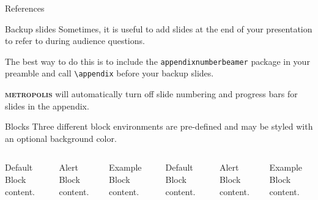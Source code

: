 \documentclass[10pt]{beamer}
\newcommand{\themename}{\textbf{\textsc{metropolis}}\xspace}
\begin{document}
\begin{frame}[allowframebreaks]{References}
  \printbibliography
\end{frame}

\begin{frame}[fragile]{Backup slides}
  Sometimes, it is useful to add slides at the end of your presentation to
  refer to during audience questions.

  The best way to do this is to include the \verb|appendixnumberbeamer|
  package in your preamble and call \verb|\appendix| before your backup slides.

  \themename will automatically turn off slide numbering and progress bars for
  slides in the appendix.
\end{frame}

\begin{frame}{Blocks}
  Three different block environments are pre-defined and may be styled with an
  optional background color.

  \begin{columns}[T,onlytextwidth]
      \begin{block}{Default}
        Block content.
      \end{block}

      \begin{alertblock}{Alert}
        Block content.
      \end{alertblock}

      \begin{exampleblock}{Example}
        Block content.
      \end{exampleblock}



      \begin{block}{Default}
        Block content.
      \end{block}

      \begin{alertblock}{Alert}
        Block content.
      \end{alertblock}

      \begin{exampleblock}{Example}
        Block content.
      \end{exampleblock}

  \end{columns}
\end{frame}
\end{document}
